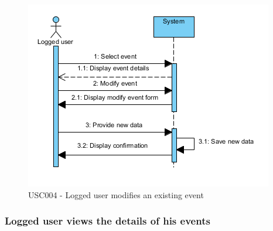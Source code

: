 \documentclass[10pt,a4paper,titlepage]{article}
\begin{document}
\begin{figure}[h]
\centering
\includegraphics[width=\linewidth]{./Sequence_diag/USC004.png}
\caption[USC004]{USC004 - Logged user modifies an existing event}
\label{fig:USC004}
\end{figure}

\clearpage
\subsubsection{Logged user views the details of his events}
\end{document}
